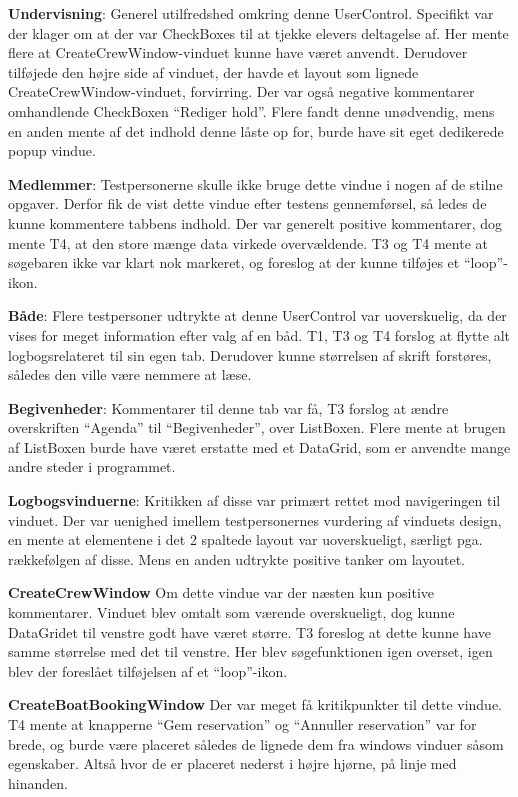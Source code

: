 \textbf{Undervisning}: 
Generel utilfredshed omkring denne UserControl.
Specifikt var der klager om at der var CheckBoxes til at tjekke elevers deltagelse af. 
Her mente flere at CreateCrewWindow-vinduet kunne have været anvendt. 
Derudover tilføjede den højre side af vinduet, der havde et layout som lignede CreateCrewWindow-vinduet, forvirring. 
Der var også negative kommentarer omhandlende CheckBoxen ``Rediger hold''. 
Flere fandt denne unødvendig, mens en anden mente af det indhold denne låste op for, burde have sit eget dedikerede popup vindue.

\textbf{Medlemmer}:
Testpersonerne skulle ikke bruge dette vindue i nogen af de stilne opgaver.
Derfor fik de vist dette vindue efter testens gennemførsel, så ledes de kunne kommentere tabbens indhold. 
Der var generelt positive kommentarer, dog mente T4, at den store mænge data virkede overvældende. 
T3 og T4 mente at søgebaren ikke var klart nok markeret, og foreslog at der kunne tilføjes et ``loop''-ikon. 

\textbf{Både}:
Flere testpersoner udtrykte at denne UserControl var uoverskuelig, da der vises for meget information efter valg af en båd.
T1, T3 og T4 forslog at flytte alt logbogsrelateret til sin egen tab.
Derudover kunne størrelsen af skrift forstøres, således den ville være nemmere at læse. 

\textbf{Begivenheder}:
Kommentarer til denne tab var få, T3 forslog at ændre overskriften ``Agenda'' til ``Begivenheder'', over ListBoxen.
Flere mente at brugen af ListBoxen burde have været erstatte med et DataGrid, som er anvendte mange andre steder i programmet. 

\textbf{Logbogsvinduerne}:
Kritikken af disse var primært rettet mod navigeringen til vinduet. 
Der var uenighed imellem testpersonernes vurdering af vinduets design, en mente at elementene i det 2 spaltede layout var uoverskueligt, særligt pga. rækkefølgen af disse. 
Mens en anden udtrykte positive tanker om layoutet.

\textbf{CreateCrewWindow}
Om dette vindue var der næsten kun positive kommentarer.
Vinduet blev omtalt som værende overskueligt, dog kunne DataGridet til venstre godt have været større.
T3 foreslog at dette kunne have samme størrelse med det til venstre. 
Her blev søgefunktionen igen overset, igen blev der foreslået tilføjelsen af et ``loop''-ikon.

\textbf{CreateBoatBookingWindow}
Der var meget få kritikpunkter til dette vindue.
T4 mente at knapperne ``Gem reservation'' og ``Annuller reservation'' var for brede, og burde være placeret således de lignede dem fra windows vinduer såsom egenskaber. 
Altså hvor de er placeret nederst i højre hjørne, på linje med hinanden. 

